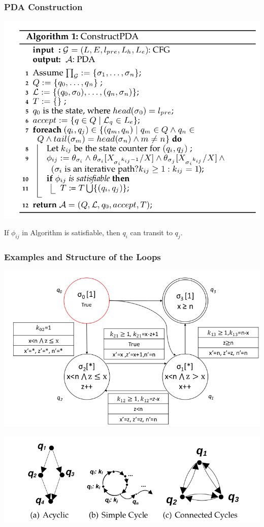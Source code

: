 \documentclass[11pt]{beamer}
\begin{document}
\begin{frame}\frametitle{PDA Construction}
\begin{center}
\includegraphics[scale=0.26]{algo1.png}
\end{center}
\begin{theorem}
If $\phi_{ij}$ in Algorithm is satisfiable, then $q_i$ can transit to $q_j$.
\end{theorem}
\end{frame}


\begin{frame}\frametitle{Examples and Structure of the Loops}

\begin{center}
\includegraphics[scale=0.3]{loopdetail.png}

\includegraphics[scale=0.3]{pdaloops.png}
\end{center}
\end{frame}
\end{document}
